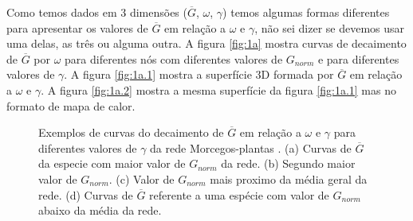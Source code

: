 \documentclass[
  12pt,
]{article}
\begin{document}
Como temos dados em 3 dimensões (\(\overline{G}\), \(\omega\),
\(\gamma\)) temos algumas formas diferentes para apresentar os valores
de \(\overline{G}\) em relação a \(\omega\) e \(\gamma\), não sei dizer
se devemos usar uma delas, as três ou alguma outra. A figura
\ref{fig:1a} mostra curvas de decaimento de \(\overline{G}\) por
\(\omega\) para diferentes nós com diferentes valores de \(G_{norm}\) e
para diferentes valores de \(\gamma\). A figura \ref{fig:1a.1} mostra a
superfície 3D formada por \(\overline{G}\) em relação a \(\omega\) e
\(\gamma\). A figura \ref{fig:1a.2} mostra a mesma superfície da figura
\ref{fig:1a.1} mas no formato de mapa de calor.

\begin{figure}[H]

{\centering {}\newline{}

}

\caption{\label{fig:1a}Exemplos de curvas do decaimento de $\overline{G}$ em relação a $\omega$ e $\gamma$ para diferentes valores de $\gamma$ da rede  Morcegos-plantas . (a) Curvas de $\overline{G}$ da especie com maior valor de $G_{norm}$ da rede. (b) Segundo maior valor de $G_{norm}$. (c) Valor de $G_{norm}$ mais proximo da média geral da rede. (d) Curvas de $\overline{G}$ referente a uma espécie com valor de $G_{norm}$ abaixo da média da rede.}\label{fig:decaimentos_ilustrativos}
\end{figure}
\end{document}
